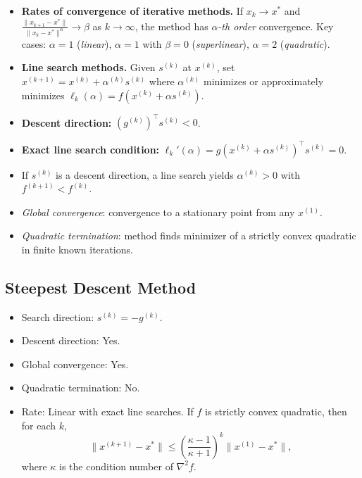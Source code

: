 \documentclass[12pt]{article}
\begin{document}
\begin{itemize}
  \item \textbf{Rates of convergence of iterative methods.} If $x_k\to x^*$ and $\displaystyle \frac{\lVert x_{k+1}-x^*\rVert}{\lVert x_k - x^*\rVert^{\alpha}} \to \beta$ as $k\to\infty$, the method has \emph{$\alpha$-th order} convergence. Key cases: $\alpha=1$ (\emph{linear}), $\alpha=1$ with $\beta=0$ (\emph{superlinear}), $\alpha=2$ (\emph{quadratic}).
  \item \textbf{Line search methods.} Given $s^{(k)}$ at $x^{(k)}$, set $x^{(k+1)} = x^{(k)} + \alpha^{(k)} s^{(k)}$ where $\alpha^{(k)}$ minimizes or approximately minimizes $\ell_k(\alpha) = f(x^{(k)} + \alpha s^{(k)})$.
  \item \textbf{Descent direction:} $(g^{(k)})^{\top} s^{(k)} < 0$.
  \item \textbf{Exact line search condition:} $\ell_k'(\alpha) = g(x^{(k)} + \alpha s^{(k)})^{\top} s^{(k)} = 0$.
  \item If $s^{(k)}$ is a descent direction, a line search yields $\alpha^{(k)}>0$ with $f^{(k+1)} < f^{(k)}$.
  \item \emph{Global convergence}: convergence to a stationary point from any $x^{(1)}$.
  \item \emph{Quadratic termination}: method finds minimizer of a strictly convex quadratic in finite known iterations.
\end{itemize}

\subsection*{Steepest Descent Method}
\begin{itemize}
  \item Search direction: $s^{(k)} = -g^{(k)}$.
  \item Descent direction: Yes.
  \item Global convergence: Yes.
  \item Quadratic termination: No.
  \item Rate: Linear with exact line searches. If $f$ is strictly convex quadratic, then for each $k$,
  \[
    \lVert x^{(k+1)} - x^* \rVert \le \left( \frac{\kappa-1}{\kappa+1} \right)^{\!k} \lVert x^{(1)} - x^* \rVert,
  \]
  where $\kappa$ is the condition number of $\nabla^2 f$.
\end{itemize}
\end{document}
